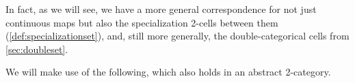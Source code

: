 \documentclass[11pt, oneside, article]{memoir}
\theoremstyle{plain}
\theoremstyle{definition}
\theoremstyle{remark}
\DeclarePairedDelimiter{\gen}{\langle}{\rangle}
\DeclarePairedDelimiter{\abs}{\lvert}{\rvert}
\newcommand{\namedcat}[1]{\mathbf{#1}}
\newcommand{\cat}[1]{\mathbf{#1}}
\newcommand{\Set}{\namedcat{Set}}
\newcommand{\CoalgOn}[2]{{#2}^{#1}}
\newcommand{\CoalgSet}[1]{\CoalgOn{#1}{\Set}}
\newcommand{\clift}[1]{\overline{#1}}
\newcommand{\pts}[1]{{\abs{#1}}}
\newcommand{\one}[1]{\pts{#1}}
\newcommand{\ptlift}[1]{\overline{#1}}
\newcommand{\carr}{\Sigma}
\newcommand{\reindex}[1]{\Delta_{#1}}
\newcommand{\car}[1]{\carr^{#1}}
\newcommand{\carP}{\car{\cP}}
\newcommand{\ph}[1]{#1}
\newcommand{\cmnd}[1]{{#1}}
\newcommand{\cC}{\cmnd{C}}
\newcommand{\bB}{\cat{B}}
\newcommand{\pP}{\ph{P}}
\newcommand{\cP}{\gen{\pP}}
\newcommand{\CSet}{\CoalgSet{\cC}}
\newcommand{\PSet}{\CoalgSet{\cP}}
\newcommand{\SetpC}{\Set^\pts{\cC}}
\newcommand{\SetpP}{\Set^\pts{\pP}}
\begin{document}

In fact, as we will see, we have a more general correspondence for not
just continuous maps but also the specialization 2-cells between them
(\cref{def:specializationset}), and, still more generally, the
double-categorical cells from \cref{sec:doubleset}.

We will make use of the following, which also holds in an abstract
2-category.
\end{document}
